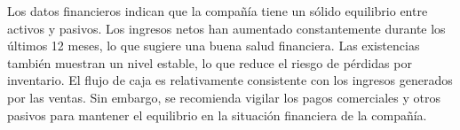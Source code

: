 

Los datos financieros indican que la compañía tiene un sólido equilibrio entre activos y pasivos. Los ingresos netos han aumentado constantemente durante los últimos 12 meses, lo que sugiere una buena salud financiera. Las existencias también muestran un nivel estable, lo que reduce el riesgo de pérdidas por inventario. El flujo de caja es relativamente consistente con los ingresos generados por las ventas. Sin embargo, se recomienda vigilar los pagos comerciales y otros pasivos para mantener el equilibrio en la situación financiera de la compañía.